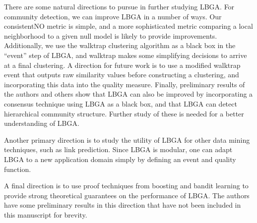 \documentclass{article}
\begin{document}
There are some natural directions to pursue in further studying LBGA. For
community detection, we can improve LBGA in a number of ways. Our consistentNO
metric is simple, and a more sophisticated metric comparing a local
neighborhood to a given null model is likely to provide improvements.
Additionally, we use the walktrap clustering algorithm as a black box in the
``event'' step of LBGA, and walktrap makes some simplifying decisions to arrive
at a final clustering. A direction for future work is to use a modified
walktrap event that outputs raw similarity values before constructing a
clustering, and incorporating this data into the quality measure. Finally,
preliminary results of the authors and others show that LBGA can also be
improved by incorporating a consensus technique using LBGA as a black box, and
that LBGA can detect hierarchical community structure. Further study of these
is needed for a better understanding of LBGA.

Another primary direction is to study the utility of LBGA for other data mining
techniques, such as link prediction. Since LBGA is modular, one can adapt LBGA
to a new application domain simply by defining an event and quality function.

A final direction is to use proof techniques from boosting and bandit learning
to provide strong theoretical guarantees on the performance of LBGA. The
authors have some preliminary results in this direction that have not been
included in this manuscript for brevity.




\end{document}
